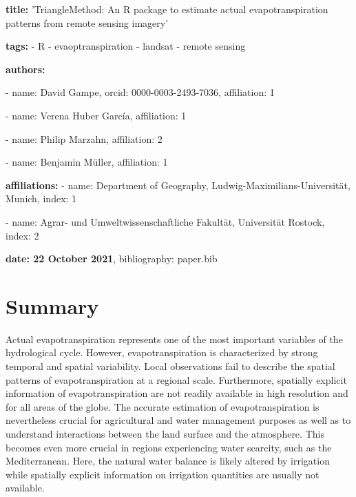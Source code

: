 \documentclass[12pt]{article}
\begin{document}

\textbf{title:} 'TriangleMethod: An R package to estimate actual evapotranspiration patterns from remote sensing imagery'

\textbf{tags:}
- R
- evaoptranspiration
- landsat
- remote sensing

\textbf{authors:}


- name: David Gampe, 
orcid: 0000-0003-2493-7036,
affiliation: 1


- name: Verena Huber García,
affiliation: 1


- name: Philip Marzahn,
affiliation: 2

- name: Benjamin Müller,
affiliation: 1


\textbf{affiliations:}
- name: Department of Geography, Ludwig-Maximilians-Universität, Munich,
index: 1


- name: Agrar- und Umweltwissenschaftliche Fakultät, Universität Rostock,
index: 2

\textbf{date: 22 October 2021}, bibliography: paper.bib

\section*{ Summary}

Actual evapotranspiration represents one of the most important variables of the hydrological cycle. However, evapotranspiration is characterized by strong temporal and spatial variability. Local observations fail to describe the spatial patterns of evapotranspiration at a regional scale. Furthermore, spatially explicit information of evapotranspiration are not readily available in high resolution and for all areas of the globe. The accurate estimation of evapotranspiration is nevertheless crucial for agricultural and water management purposes as well as to understand interactions between the land surface and the atmosphere. This becomes even more crucial in regions experiencing water scarcity, such as the Mediterranean. Here, the natural water balance is likely altered by irrigation while spatially explicit information on irrigation quantities are usually not available. 
\end{document}
